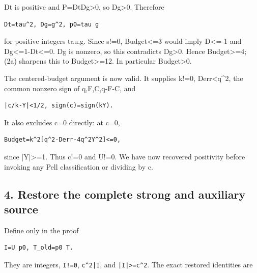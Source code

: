 Dt is positive and P=\allowbreak{}DtDg\textgreater{}\allowbreak{}0, so Dg\textgreater{}\allowbreak{}0. Therefore



\begin{verbatim}
Dt=tau^2, Dg=g^2, p0=tau g
\end{verbatim}

for positive integers tau,g. Since s!=\allowbreak{}0, Budget\textless{}\allowbreak{}=\allowbreak{}3 would imply D\textless{}\allowbreak{}=\allowbreak{}-1 and Dg\textless{}\allowbreak{}=\allowbreak{}1-Dt\textless{}\allowbreak{}=\allowbreak{}0. Dg is nonzero, so this contradicts Dg\textgreater{}\allowbreak{}0. Hence Budget\textgreater{}\allowbreak{}=\allowbreak{}4; (2a) sharpens this to Budget\textgreater{}\allowbreak{}=\allowbreak{}12. In particular Budget\textgreater{}\allowbreak{}0.



The centered-budget argument is now valid. It supplies k!=\allowbreak{}0, Derr\textless{}\allowbreak{}q\textasciicircum{}\allowbreak{}2, the common nonzero sign of q,F,C,q-F-C, and



\begin{verbatim}
|c/k-Y|<1/2, sign(c)=sign(kY).
\end{verbatim}

It also excludes c=\allowbreak{}0 directly: at c=\allowbreak{}0,



\begin{verbatim}
Budget=k^2[q^2-Derr-4q^2Y^2]<=0,
\end{verbatim}

since |Y|\textgreater{}\allowbreak{}=\allowbreak{}1. Thus c!=\allowbreak{}0 and U!=\allowbreak{}0. We have now recovered positivity before invoking any Pell classification or dividing by c.



\subsection{4. Restore the complete strong and auxiliary source}



Define only in the proof



\begin{verbatim}
I=U p0, T_old=p0 T.
\end{verbatim}

They are integers, \texttt{I!=\allowbreak{}0}, \texttt{c\textasciicircum{}\allowbreak{}2|I}, and \texttt{|I|\textgreater{}\allowbreak{}=\allowbreak{}c\textasciicircum{}\allowbreak{}2}. The exact restored identities are



